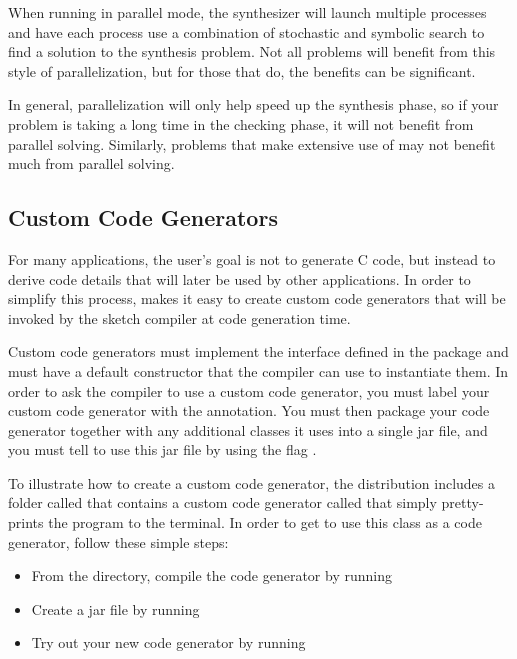 When running in parallel mode, the \Sk{} synthesizer will launch multiple processes and have each process use a combination of stochastic and symbolic search to find a solution to the synthesis problem. Not all problems will benefit from this style of parallelization, but for those that do, the benefits can be significant. 

In general, parallelization will only help speed up the synthesis phase, so if your problem is taking a long time in the checking phase, it will not benefit from parallel solving. Similarly, problems that make extensive use of  may not benefit much from parallel solving.


\subsection{Custom Code Generators}

For many applications, the user's goal is not to generate C code, but instead to derive code details that will later be used by other applications. In order to simplify this process, \Sk{} makes it easy to create custom code generators that will be invoked by the sketch compiler at code generation time. 

Custom code generators must implement the  interface defined in the  package and must have a default constructor that the compiler can use to instantiate them. In order to ask the compiler to use a custom code generator, you must label your custom code generator with the  annotation. You must then package your code generator together with any additional classes it uses into a single jar file, and you must tell \Sk{} to use this jar file by using the flag . 



To illustrate how to create a custom code generator, the \Sk{} distribution includes a folder called  that contains a custom code generator called  that simply pretty-prints the program to the terminal. In order to get \Sk{} to use this class as a code generator, follow these simple steps:

\begin{itemize}
\item From the  directory, compile the code generator by running \newline
 \version{}
\item Create a jar file by running \newline
{}
\item Try out your new code generator by running \newline
{}
\end{itemize}

